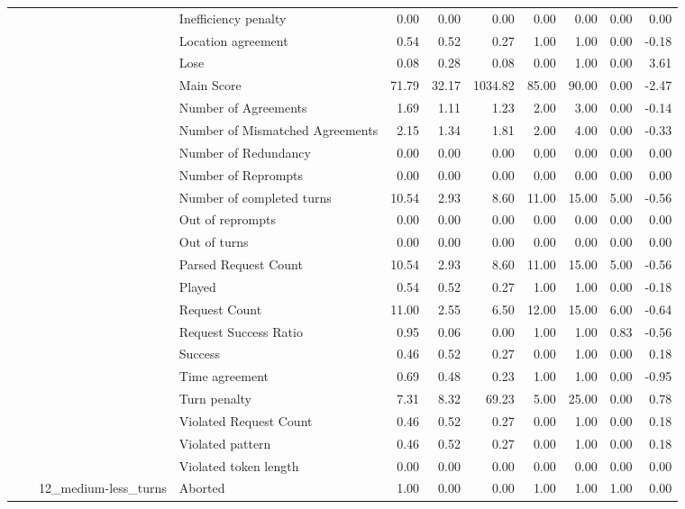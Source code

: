\begin{tabular}{llllrrrrrrr}
 &  &  & Inefficiency penalty & 0.00 & 0.00 & 0.00 & 0.00 & 0.00 & 0.00 & 0.00 \\
 &  &  & Location agreement & 0.54 & 0.52 & 0.27 & 1.00 & 1.00 & 0.00 & -0.18 \\
 &  &  & Lose & 0.08 & 0.28 & 0.08 & 0.00 & 1.00 & 0.00 & 3.61 \\
 &  &  & Main Score & 71.79 & 32.17 & 1034.82 & 85.00 & 90.00 & 0.00 & -2.47 \\
 &  &  & Number of Agreements & 1.69 & 1.11 & 1.23 & 2.00 & 3.00 & 0.00 & -0.14 \\
 &  &  & Number of Mismatched Agreements & 2.15 & 1.34 & 1.81 & 2.00 & 4.00 & 0.00 & -0.33 \\
 &  &  & Number of Redundancy & 0.00 & 0.00 & 0.00 & 0.00 & 0.00 & 0.00 & 0.00 \\
 &  &  & Number of Reprompts & 0.00 & 0.00 & 0.00 & 0.00 & 0.00 & 0.00 & 0.00 \\
 &  &  & Number of completed turns & 10.54 & 2.93 & 8.60 & 11.00 & 15.00 & 5.00 & -0.56 \\
 &  &  & Out of reprompts & 0.00 & 0.00 & 0.00 & 0.00 & 0.00 & 0.00 & 0.00 \\
 &  &  & Out of turns & 0.00 & 0.00 & 0.00 & 0.00 & 0.00 & 0.00 & 0.00 \\
 &  &  & Parsed Request Count & 10.54 & 2.93 & 8.60 & 11.00 & 15.00 & 5.00 & -0.56 \\
 &  &  & Played & 0.54 & 0.52 & 0.27 & 1.00 & 1.00 & 0.00 & -0.18 \\
 &  &  & Request Count & 11.00 & 2.55 & 6.50 & 12.00 & 15.00 & 6.00 & -0.64 \\
 &  &  & Request Success Ratio & 0.95 & 0.06 & 0.00 & 1.00 & 1.00 & 0.83 & -0.56 \\
 &  &  & Success & 0.46 & 0.52 & 0.27 & 0.00 & 1.00 & 0.00 & 0.18 \\
 &  &  & Time agreement & 0.69 & 0.48 & 0.23 & 1.00 & 1.00 & 0.00 & -0.95 \\
 &  &  & Turn penalty & 7.31 & 8.32 & 69.23 & 5.00 & 25.00 & 0.00 & 0.78 \\
 &  &  & Violated Request Count & 0.46 & 0.52 & 0.27 & 0.00 & 1.00 & 0.00 & 0.18 \\
 &  &  & Violated pattern & 0.46 & 0.52 & 0.27 & 0.00 & 1.00 & 0.00 & 0.18 \\
 &  &  & Violated token length & 0.00 & 0.00 & 0.00 & 0.00 & 0.00 & 0.00 & 0.00 \\
\cline{3-11}
 &  & \multirow[t]{27}{*}{12_medium-less_turns} & Aborted & 1.00 & 0.00 & 0.00 & 1.00 & 1.00 & 1.00 & 0.00 \\

\end{tabular}
